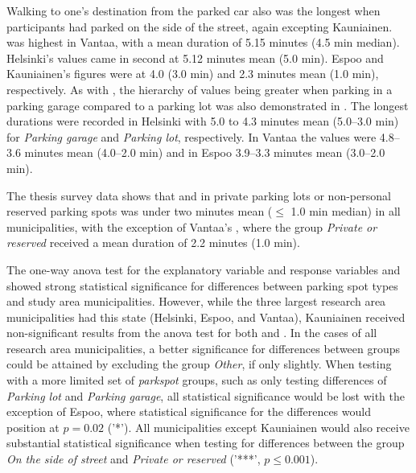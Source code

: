 Walking to one's destination from the parked car also was the longest when participants had parked on the side of the street, again excepting Kauniainen.  was highest in Vantaa, with a mean duration of 5.15 minutes (4.5 min median). Helsinki's values came in second at 5.12 minutes mean (5.0 min). Espoo and Kauniainen's figures were at 4.0 (3.0 min) and 2.3 minutes mean (1.0 min), respectively. As with , the hierarchy of values being greater when parking in a parking garage compared to a parking lot was also demonstrated in . The longest durations were recorded in Helsinki with 5.0 to 4.3 minutes mean (5.0--3.0 min) for \textit{Parking garage} and \textit{Parking lot}, respectively. In Vantaa the values were 4.8--3.6 minutes mean (4.0--2.0 min) and in Espoo 3.9--3.3 minutes mean (3.0--2.0 min). 

The thesis survey data shows that  and  in private parking lots or non-personal reserved parking spots was under two minutes mean ($\leq$ 1.0 min median) in all municipalities, with the exception of Vantaa's , where the group \textit{Private or reserved} received a mean duration of 2.2 minutes (1.0 min).

The one-way \acrshort{anova} test for the explanatory variable  and response variables  and  showed strong statistical significance for differences between parking spot types and study area municipalities. However, while the three largest research area municipalities had this state (Helsinki, Espoo, and Vantaa), Kauniainen received non-significant results from the \acrshort{anova} test for both  and . In the cases of all research area municipalities, a better significance for differences between  groups could be attained by excluding the group \textit{Other}, if only slightly. When testing with a more limited set of \textit{parkspot} groups, such as only testing differences of \textit{Parking lot} and \textit{Parking garage}, all statistical significance would be lost with the exception of Espoo, where statistical significance for the differences would position at $p = 0.02$ ('*'). All municipalities except Kauniainen would also receive substantial statistical significance when testing for differences between the group \textit{On the side of street} and \textit{Private or reserved} ('***', $p \leq 0.001$).

